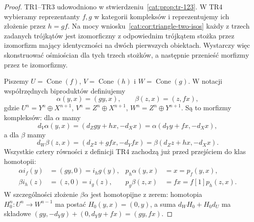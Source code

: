 \begin{proof}
TR1--TR3 udowodniono w stwierdzeniu~\ref{cat:prop:tr-123}. W TR4 wybieramy reprezentanty $f,g$ w kategorii kompleksów i reprezentujemy ich złożenie przez $h=gf$. Na mocy wniosku~\ref{cat:cor:triangle-two-isos} każdy z trzech zadanych trójkątów jest izomorficzny z odpowiednim trójkątem stożka przez izomorfizm mający identyczności na dwóch pierwszych obiektach. Wystarczy więc skonstruować ośmiościan dla tych trzech stożków, a następnie przenieść morfizmy przez te izomorfizmy.

Piszemy $U=\operatorname{Cone}(f)$, $V=\operatorname{Cone}(h)$ i $W=\operatorname{Cone}(g)$. W notacji współrzędnych biproduktów definiujemy
\[
 \alpha(y,x)=(gy,x),\qquad \beta(z,x)=(z,fx),
\]
gdzie $U^n=Y^n\oplus X^{n+1}$, $V^n=Z^n\oplus X^{n+1}$, $W^n=Z^n\oplus Y^{n+1}$. Są to morfizmy kompleksów: dla $\alpha$ mamy
\[
 d_V\alpha(y,x)=(d_Zgy+h x,-d_Xx)
 =\alpha(d_Yy+fx,-d_Xx),
\]
a dla $\beta$ mamy
\[
 d_W\beta(z,x)=(d_Zz+gfx,-d_Yfx)
 =\beta(d_Zz+hx,-d_Xx).
\]
Wszystkie cztery równości z definicji TR4 zachodzą już przed przejściem do klas homotopii:
\[
\begin{aligned}
 \alpha i_f(y)&=(gy,0)=i_hg(y),&
 p_h\alpha(y,x)&=x=p_f(y,x),\\
 \beta i_h(z)&=(z,0)=i_g(z),&
 p_g\beta(z,x)&=fx=f[1]p_h(z,x).
\end{aligned}
\]
W szczególności złożenie $\beta\alpha$ jest homotopijne z zerem: homotopia $H_0^n:U^n\to W^{n-1}$ ma postać $H_0(y,x)=(0,y)$, a suma $d_WH_0+H_0d_U$ ma składowe $(gy,-d_Yy)+(0,d_Yy+fx)=(gy,fx)$.


\end{proof}
